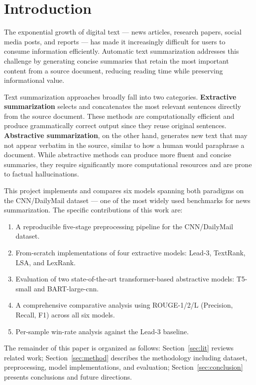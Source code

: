 \documentclass[conference]{IEEEtran}
\begin{document}
\section{Introduction}

The exponential growth of digital text --- news articles, research
papers, social media posts, and reports --- has made it increasingly
difficult for users to consume information efficiently. Automatic text
summarization addresses this challenge by generating concise summaries
that retain the most important content from a source document, reducing
reading time while preserving informational value.

Text summarization approaches broadly fall into two categories.
\textbf{Extractive summarization} selects and concatenates the most
relevant sentences directly from the source document. These methods are
computationally efficient and produce grammatically correct output since
they reuse original sentences. \textbf{Abstractive summarization}, on
the other hand, generates new text that may not appear verbatim in the
source, similar to how a human would paraphrase a document. While
abstractive methods can produce more fluent and concise summaries, they
require significantly more computational resources and are prone to
factual hallucinations.

This project implements and compares six models spanning both paradigms
on the CNN/DailyMail dataset \cite{hermann2015} --- one of the most
widely used benchmarks for news summarization. The specific contributions
of this work are:

\begin{enumerate}
    \item A reproducible five-stage preprocessing pipeline for the
          CNN/DailyMail dataset.
    \item From-scratch implementations of four extractive models:
          Lead-3, TextRank, LSA, and LexRank.
    \item Evaluation of two state-of-the-art transformer-based
          abstractive models: T5-small and BART-large-cnn.
    \item A comprehensive comparative analysis using ROUGE-1/2/L
          (Precision, Recall, F1) across all six models.
    \item Per-sample win-rate analysis against the Lead-3 baseline.
\end{enumerate}

The remainder of this paper is organized as follows: Section~\ref{sec:lit}
reviews related work; Section~\ref{sec:method} describes the methodology
including dataset, preprocessing, model implementations, and evaluation;
Section~\ref{sec:conclusion} presents conclusions and future directions.
\end{document}
